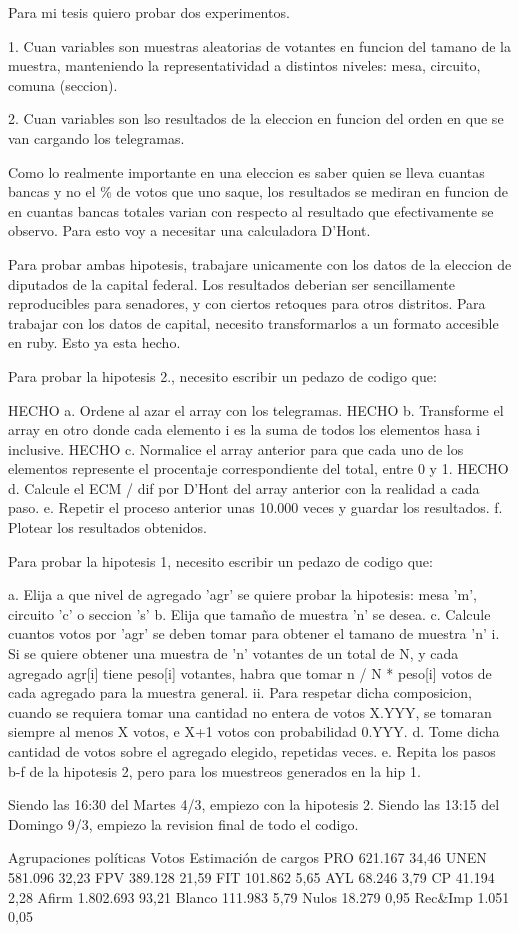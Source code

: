 Para mi tesis quiero probar dos experimentos.

1. Cuan variables son muestras aleatorias de votantes en funcion del tamano de la muestra, manteniendo la representatividad a distintos niveles: mesa, circuito, comuna (seccion).

2. Cuan variables son lso resultados de la eleccion en funcion del orden en que se van cargando los telegramas.

Como lo realmente importante en una eleccion es saber quien se lleva cuantas bancas y no el \% de votos que uno saque, los resultados se mediran en funcion de en cuantas bancas totales varian con respecto al resultado que efectivamente se observo. Para esto voy a necesitar una calculadora D'Hont.

Para probar ambas hipotesis, trabajare unicamente con los datos de la eleccion de diputados de la capital federal. Los resultados deberian ser sencillamente reproducibles para senadores, y con ciertos retoques para otros distritos. Para trabajar con los datos de capital, necesito transformarlos a un formato accesible en ruby. Esto ya esta hecho.

Para probar la hipotesis 2., necesito escribir un pedazo de codigo que:

HECHO	a. Ordene al azar el array con los telegramas.
HECHO	b. Transforme el array en otro donde cada elemento i es la suma de todos los elementos hasa i inclusive.
HECHO	c. Normalice el array anterior para que cada uno de los elementos represente el procentaje correspondiente del total, entre 0 y 1.
HECHO	d. Calcule el ECM / dif por D'Hont del array anterior con la realidad a cada paso. %
	e. Repetir el proceso anterior unas 10.000 veces y guardar los resultados.
	f. Plotear los resultados obtenidos.

Para probar la hipotesis 1, necesito escribir un pedazo de codigo que:

	a. Elija a que nivel de agregado 'agr' se quiere probar la hipotesis: mesa 'm', circuito 'c' o seccion 's'
	b. Elija que tama\~no de muestra 'n' se desea.
	c. Calcule cuantos votos por 'agr' se deben tomar para obtener el tamano de muestra 'n'
		i. Si se quiere obtener una muestra de 'n' votantes de un total de N, y cada agregado agr[i] tiene peso[i] votantes, habra que tomar n / N * peso[i] votos de cada agregado para la muestra general.
		ii. Para respetar dicha composicion, cuando se requiera tomar una cantidad no entera de votos X.YYY, se tomaran siempre al menos X votos, e X+1 votos con probabilidad 0.YYY.
	d. Tome dicha cantidad de votos sobre el agregado elegido, repetidas veces.
	e. Repita los pasos b-f de la hipotesis 2, pero para los muestreos generados en la hip 1.

Siendo las 16:30 del Martes 4/3, empiezo con la hipotesis 2.
Siendo las 13:15 del Domingo 9/3, empiezo la revision final de todo el codigo.



Agrupaciones políticas 	Votos 	Estimación de cargos
PRO 	621.167 	34,46%
UNEN 	581.096 	32,23%
FPV 	389.128 	21,59%
FIT 	101.862 	5,65%
AYL 	68.246 		3,79%
CP 	41.194 		2,28%
Afirm 	1.802.693 	93,21%
Blanco 	111.983 	5,79%
Nulos 	18.279 		0,95%
Rec&Imp	1.051 		0,05%
